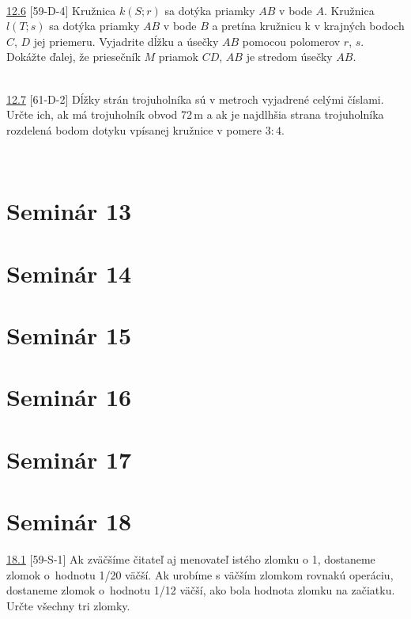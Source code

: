 \\

\noindent \ul{12.6} [59-D-4] Kružnica $k(S; r)$ sa dotýka priamky $AB$ v bode $A$. Kružnica $l(T; s)$ sa dotýka priamky $AB$ v bode $B$ a pretína kružnicu k v krajných bodoch $C$, $D$ jej priemeru. Vyjadrite dĺžku a úsečky $AB$ pomocou polomerov $r$, $s$. Dokážte ďalej, že priesečník $M$ priamok $CD$, $AB$ je stredom úsečky $AB$.


\\

\noindent \ul{12.7} [61-D-2] Dĺžky strán trojuholníka sú v metroch vyjadrené celými číslami. Určte ich, ak má trojuholník obvod 72\,m a ak je najdlhšia strana trojuholníka rozdelená bodom dotyku vpísanej kružnice v pomere $3 : 4.$


\\

\section*{Seminár 13}

\section*{Seminár 14}

\section*{Seminár 15}

\section*{Seminár 16}

\section*{Seminár 17}

\section*{Seminár 18}

\noindent \ul{18.1} [59-S-1]
 Ak zväčšíme čitateľ aj menovateľ istého zlomku o 1, dostaneme zlomok o~hodnotu 1/20 väčší. Ak urobíme s väčším zlomkom rovnakú operáciu, dostaneme zlomok o~hodnotu 1/12 väčší, ako bola hodnota zlomku na začiatku. Určte všechny tri zlomky.


\\

